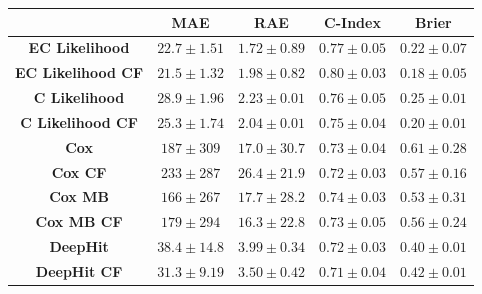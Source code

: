 \begin{table}
        \resizebox*{1.0\linewidth}{0.1\textheight}
        {
            \begin{tabular}{||c|cc|c|c||}
                \hline
                                            & \textbf{\gls{MAE}} & \textbf{\gls{RAE}} & \textbf{C-Index}  & \textbf{Brier}    \\
                \hline
                \textbf{EC Likelihood}      & $22.7\pm1.51$      & $1.72\pm0.89$      & $0.77\pm0.05$     & $0.22\pm0.07$      \\
                \textbf{EC Likelihood CF}   & $21.5\pm1.32$      & $1.98\pm0.82$      & $0.80\pm0.03$     & $0.18\pm0.05$      \\
                \textbf{C Likelihood}       & $28.9\pm1.96$      & $2.23\pm0.01$      & $0.76\pm0.05$     & $0.25\pm0.01$      \\
                \textbf{C Likelihood CF}    & $25.3\pm1.74$      & $2.04\pm0.01$      & $0.75\pm0.04$     & $0.20\pm0.01$      \\
                \hline
                \textbf{Cox}                & $187 \pm309 $      & $17.0\pm30.7$      & $0.73\pm0.04$     & $0.61\pm0.28$      \\
                \textbf{Cox CF}             & $233 \pm287 $      & $26.4\pm21.9$      & $0.72\pm0.03$     & $0.57\pm0.16$      \\
                \textbf{Cox \gls{MB}}       & $166 \pm267 $      & $17.7\pm28.2$      & $0.74\pm0.03$     & $0.53\pm0.31$      \\
                \textbf{Cox \gls{MB} CF}    & $179 \pm294 $      & $16.3\pm22.8$      & $0.73\pm0.05$     & $0.56\pm0.24$      \\
                \hline
                \textbf{DeepHit}            & $38.4\pm14.8$      & $3.99\pm0.34$      & $0.72\pm0.03$     & $0.40\pm0.01$      \\
                \textbf{DeepHit CF}         & $31.3\pm9.19$      & $3.50\pm0.42$      & $0.71\pm0.04$     & $0.42\pm0.01$      \\
                \hline
            \end{tabular}
        }
        \label{tab:table}
        
    \end{table}

